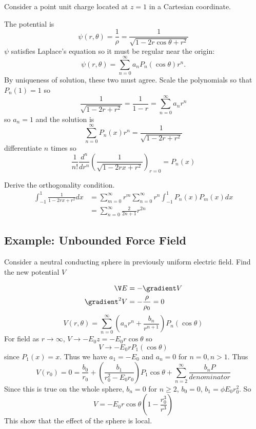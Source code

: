 \documentclass[a4paper]{article}
\newcommand*{\grad}{\gradient}
\newcommand*{\laplace}{\grad^2}
\newcommand*{\lap}{\laplace}
\begin{document}
Consider a point unit charge located at \(z = 1\) in a Cartesian coordinate.

The potential is
\[
  \psi(r, \theta) = \frac{1}{\rho} = \frac{1}{\sqrt{1 - 2r \cos \theta + r^2}}
\]
\(\psi\) satisfies Laplace's equation so it must be regular near the origin:
\[
  \psi(r, \theta) = \sum_{n = 0}^{\infty} a_n P_n(\cos \theta) r^n.
\]
By uniqueness of solution, these two must agree. Scale the polynomials so that \(P_n(1) = 1\) so
\[
  \frac{1}{\sqrt{1 - 2r + r^2}} = \frac{1}{1 - r} = \sum_{n = 0}^{\infty} a_n r^n
\]
so \(a_n = 1\) and the solution is
\[
  \sum_{n = 0}^{\infty} P_n(x)r^n = \frac{1}{\sqrt{1 - 2r + r^2}}
\]
differentiate \(n\) times so
\[
  \frac{1}{n!} \frac{d^n}{dr^n} \left( \frac{1}{\sqrt{1 - 2rx +r^2}} \right)_{r = 0} = P_n(x)
\]

\begin{ex}
  Derive the orthogonality condition.
  \begin{align*}
    \int_{-1}^{1} \frac{1}{1 - 2rx + r^2} dx &= \sum_{m = 0}^{\infty} r^m \sum_{n = 0}^{\infty} r^n \int_{-1}^{1} P_n(x)P_m(x) dx \\
                                             &= \sum_{n = 0}^{\infty} \frac{2}{2n + 1} r^{2n}
  \end{align*}
\end{ex}

\subsection{Example: Unbounded Force Field}

Consider a neutral conducting sphere in previously uniform electric field. Find the new potential \(V\)

\begin{align*}
  \V E &= -\grad V \\
  \lap V &= -\frac{\rho}{\rho_0} = 0
\end{align*}
\[
  V(r, \theta) = \sum_{n = 0}^{\infty}(a_n r^n + \frac{b_n}{r^{n + 1}}) P_n(\cos \theta)
\]
For field as \(r \to \infty\), \(V \to - E_0z = -E_0r \cos \theta\) so
\[
  V \to -E_0rP_1(\cos \theta)
\]
since \(P_1(x) = x\). Thus we have \(a_1 = - E_0\) and \(a_n = 0\) for \(n = 0, n > 1\). Thus
\[
  V(r_0) = 0 = \frac{b_0}{r_0} + \left( \frac{b_1}{r_0^2 - E_0r_0} \right) P_1 \cos \theta + \sum_{n = 2}^{\infty} \frac{b_nP}{denominator}
\]
Since this is true on the whole sphere, \(b_n = 0\) for \(n \geq 2\), \(b_0 = 0\), \(b_1 = \phi E_0 r_0^2\). So
\[
  V = -E_0 r \cos \theta \left( 1 - \frac{r_0^3}{r^3} \right)
\]
This show that the effect of the sphere is local.
\end{document}
